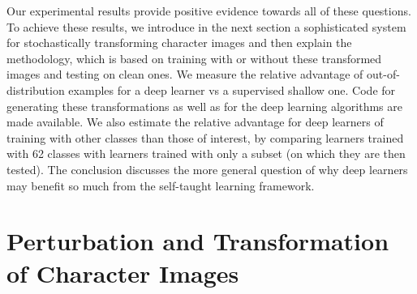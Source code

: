 \documentclass{article} %
\begin{document}
Our experimental results provide positive evidence towards all of these questions.
To achieve these results, we introduce in the next section a sophisticated system
for stochastically transforming character images and then explain the methodology,
which is based on training with or without these transformed images and testing on 
clean ones. We measure the relative advantage of out-of-distribution examples
for a deep learner vs a supervised shallow one.
Code for generating these transformations as well as for the deep learning 
algorithms are made available. 
We also estimate the relative advantage for deep learners of training with
other classes than those of interest, by comparing learners trained with
62 classes with learners trained with only a subset (on which they
are then tested).
The conclusion discusses
the more general question of why deep learners may benefit so much from 
the self-taught learning framework.

\vspace*{-3mm}
\section{Perturbation and Transformation of Character Images}
\label{s:perturbations}
\vspace*{-2mm}
\end{document}

